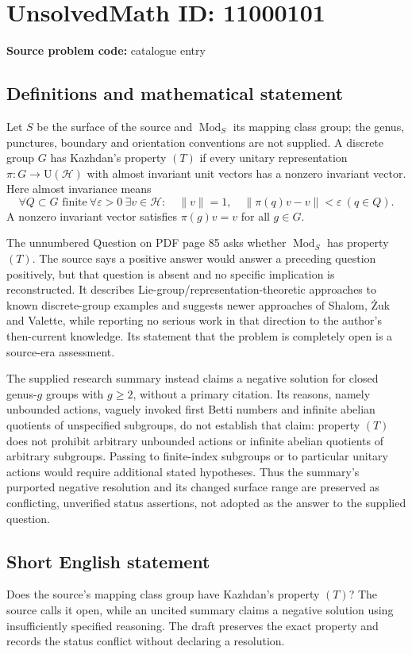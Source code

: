 \documentclass[11pt]{article}
\newcommand{\eps}{\varepsilon}
\begin{document}
\section*{UnsolvedMath ID: 11000101}
\textbf{Source problem code:} catalogue entry
\subsection{Definitions and mathematical statement}
Let \(S\) be the surface of the source and \(\operatorname{Mod}_S\) its mapping class group; the genus, punctures, boundary and orientation conventions are not supplied. A discrete group \(G\) has Kazhdan's property \((T)\) if every unitary representation \(\pi:G\to\mathrm U(\mathcal H)\) with almost invariant unit vectors has a nonzero invariant vector. Here almost invariance means
\[
 \forall Q\subset G\text{ finite}\ \forall\eps>0\ \exists v\in\mathcal H:
 \quad\|v\|=1,\quad\|\pi(q)v-v\|<\eps\ (q\in Q).
\]
A nonzero invariant vector satisfies \(\pi(g)v=v\) for all \(g\in G\).

The unnumbered Question on PDF page 85 asks whether \(\operatorname{Mod}_S\) has property \((T)\). The source says a positive answer would answer a preceding question positively, but that question is absent and no specific implication is reconstructed. It describes Lie-group/representation-theoretic approaches to known discrete-group examples and suggests newer approaches of Shalom, Żuk and Valette, while reporting no serious work in that direction to the author's then-current knowledge. Its statement that the problem is completely open is a source-era assessment.

The supplied research summary instead claims a negative solution for closed genus-\(g\) groups with \(g\ge2\), without a primary citation. Its reasons, namely unbounded actions, vaguely invoked first Betti numbers and infinite abelian quotients of unspecified subgroups, do not establish that claim: property \((T)\) does not prohibit arbitrary unbounded actions or infinite abelian quotients of arbitrary subgroups. Passing to finite-index subgroups or to particular unitary actions would require additional stated hypotheses. Thus the summary's purported negative resolution and its changed surface range are preserved as conflicting, unverified status assertions, not adopted as the answer to the supplied question.
\subsection{Short English statement}
Does the source's mapping class group have Kazhdan's property \((T)\)? The source calls it open, while an uncited summary claims a negative solution using insufficiently specified reasoning. The draft preserves the exact property and records the status conflict without declaring a resolution.
\end{document}
